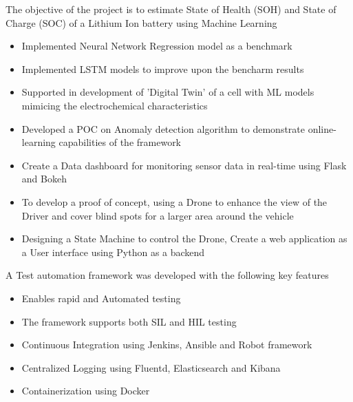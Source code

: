 \documentclass[10pt,a4paper,ragged2e,withhyper]{altacv}
\begin{document}
            The objective of the project is to estimate State of Health (SOH) and State of Charge (SOC) of a Lithium Ion battery using Machine Learning
            \begin{itemize}
                \item Implemented Neural Network Regression model as a benchmark
                \item Implemented LSTM models to improve upon the bencharm results
                \item Supported in development of 'Digital Twin' of a cell with ML models mimicing the electrochemical characteristics
                \item Developed a POC on Anomaly detection algorithm to demonstrate online-learning capabilities of the framework
                \item Create a Data dashboard for monitoring sensor data in real-time using Flask and Bokeh
            \end{itemize}
            \divider

            \begin{itemize}
                \item  To develop a proof of concept, using a Drone to enhance the view of the Driver and cover blind spots for a larger area around the vehicle

                \item  Designing a State Machine to control the Drone, Create a web application as a User interface using Python as a backend
            \end{itemize}
            \divider

            A Test automation framework was developed with the following key features \linebreak
            \begin{itemize}
                \item Enables rapid and Automated testing
                \item The framework supports both SIL and HIL testing
                \item Continuous Integration using Jenkins, Ansible and Robot framework
                \item Centralized Logging using Fluentd, Elasticsearch and Kibana
                \item Containerization using Docker
            \end{itemize}
\end{document}

